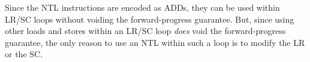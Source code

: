 \begin{commentary}
Since the NTL instructions are encoded as ADDs, they can be used within LR/SC
loops without voiding the forward-progress guarantee.
But, since using other loads and stores within an LR/SC loop {\em does}
void the forward-progress guarantee, the only reason to use an NTL
within such a loop is to modify the LR or the SC.
\end{commentary}
